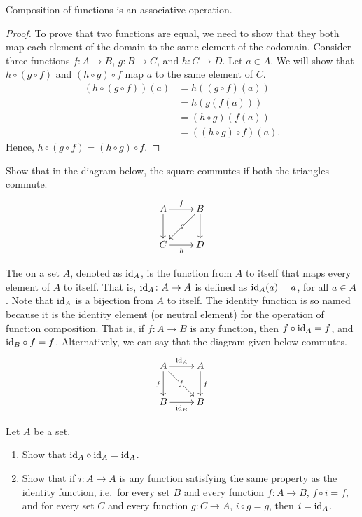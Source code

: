 \begin{Theorem}\label{thm:FuncCompAssoc}
Composition of functions is an associative operation.
\end{Theorem}

\begin{proof}
To prove that two functions are equal, we need to show that they both map each element of the domain to the same element of the codomain. Consider three functions $f \colon A \to B$, $g \colon B \to C$, and $h \colon C \to D$. Let $a \in A$. We will show that $h \circ (g \circ f)$ and $(h \circ g) \circ f$ map $a$ to the same element of $C$.
\begin{align*}
(h \circ (g \circ f))(a) & = h((g \circ f)(a)) \\
    & = h(g(f(a))) \\
    & = (h \circ g)(f(a)) \\
    & = ((h \circ g) \circ f)(a).
\end{align*}
Hence, $h \circ (g \circ f) = (h \circ g) \circ f$.
\end{proof}

\begin{Exercise}
Show that in the diagram below, the square commutes if both the triangles commute.
\begin{equation*}
\xymatrix{
A \ar[r]^f \ar[d] & B \ar[dl]|-g \ar[d]\\
C \ar[r]_h & D
}
\end{equation*}
\end{Exercise}

The  on a set $A$, denoted as $\mathrm{id}_A$, is the function from $A$ to itself that maps every element of $A$ to itself. That is, $\mathrm{id}_A \colon A \to A$ is defined as $\mathrm{id}_A(a) = a$, for all $a \in A$. Note that $\mathrm{id}_A$ is a bijection from $A$ to itself. The identity function is so named because it is the identity element (or neutral element) for the operation of function composition. That is, if $f \colon A \to B$ is any function, then $f \circ \mathrm{id}_A = f$, and $\mathrm{id}_B \circ f = f$. Alternatively, we can say that the diagram given below commutes.
\begin{equation*}
\xymatrix{
A \ar[d]_{f} \ar[r]^{\id_A} \ar[dr]|-f & A \ar[d]^{f}\\
B \ar[r]_{\id_B} & B
}
\end{equation*}

\begin{Exercise}
Let $A$ be a set.
\begin{enumerate}
\item Show that $\mathrm{id}_A \circ \mathrm{id}_A = \mathrm{id}_A$.
\item Show that if $i \colon A \to A$ is any function satisfying the same property as the identity function, i.e.\ for every set $B$ and every function $f \colon A \to B$, $f \circ i = f$, and for every set $C$ and every function $g \colon C \to A$, $i \circ g = g$,  then $i = \mathrm{id}_A$.
\end{enumerate}
\end{Exercise}

